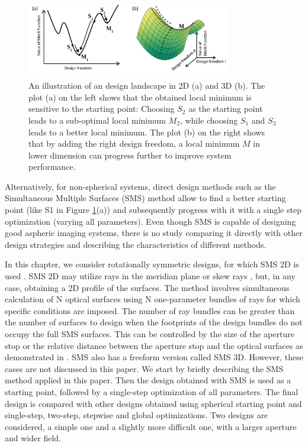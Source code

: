 \begin{figure}[h!]
    \centering
    \includegraphics[width=0.8\textwidth]{chapter-5/figures/Figure1_landscape.png}
    \caption{An illustration of an design landscape in 2D (a) and 3D (b). The plot (a) on the left shows that the obtained local minimum is sensitive to the starting point: Choosing $S_2$ as the starting point leads to a sub-optimal local minimum $M_2$, while choosing $S_1$ and $S_3$ leads to a better local minimum. The plot (b) on the right shows that by adding the right design freedom, a local minimum $M$ in lower dimension can progress further to improve system performance.}
    
    \label{fig: fig1_landscape}
\end{figure}
Alternatively, for non-spherical systems, direct design methods such as the Simultaneous Multiple Surfaces (SMS) method allow to find a better starting point (like S1 in Figure \ref{fig: fig1_landscape}(a)) \cite{WangThesis}\cite{LinWang12OE} and subsequently progress with it with a single step optimization (varying all parameters). Even though SMS is capable of designing good aspheric imaging systems, there is no study comparing it directly with other design strategies and describing the characteristics of different methods.

In this chapter, we consider rotationally symmetric designs, for which SMS 2D is used \cite{book:ChavesNonimagingOptics}. SMS 2D may utilize rays in the meridian plane or skew rays \cite{LinWang2011}, but, in any case, obtaining a 2D profile of the surfaces. The method involves simultaneous calculation of N optical surfaces using N one-parameter bundles of rays for which specific conditions are imposed. The number of ray bundles can be greater than the number of surfaces to design when the footprints of the design bundles do not occupy the full SMS surfaces. This can be controlled by the size of the aperture stop or the relative distance between the aperture stop and the optical surfaces as demonstrated in \cite{BenitezSPIE2014}\cite{FDuerrOE2013}\cite{FDuerrOE12}. SMS also has a freeform version called SMS 3D. However, these cases are not discussed in this paper. 
We start by briefly describing the SMS method applied in this paper. Then the design obtained with SMS is used as a starting point, followed by a single-step optimization of all parameters. The final design is compared with other designs obtained using spherical starting point and single-step, two-step, stepwise and global optimizations. Two designs are considered, a simple one and a slightly more difficult one, with a larger aperture and wider field.

